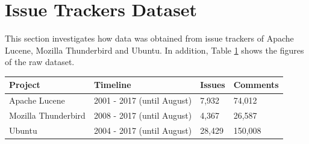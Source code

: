 \documentclass[a4paper,12pt,twoside]{report}
\begin{document}
\section{Issue Trackers Dataset}
This section investigates how data was obtained from issue trackers of Apache Lucene, Mozilla Thunderbird and Ubuntu. In addition, Table \ref{tab:rawIssueTrackers} shows the figures of the raw dataset. 

\begin{table}[H] %
    \centering
    \begin{adjustbox}{max width=\columnwidth}
    \def\arraystretch{1} %
    \begin{tabular}{p{4cm} p{5cm} p{2cm} p{3cm}}
        \toprule
        \textbf{Project} & \textbf{Timeline} & \textbf{Issues} & \textbf{Comments}\\
        \midrule
			Apache Lucene & 2001 - 2017 (until August) & 7,932 & 74,012\\
			Mozilla Thunderbird & 2008 - 2017 (until August) & 4,367 & 26,587\\ 
			Ubuntu & 2004 - 2017 (until August) & 28,429 & 150,008\\
        \midrule
    \end{tabular}
    \end{adjustbox}
    \label{tab:rawIssueTrackers}
\end{table}
\end{document}
